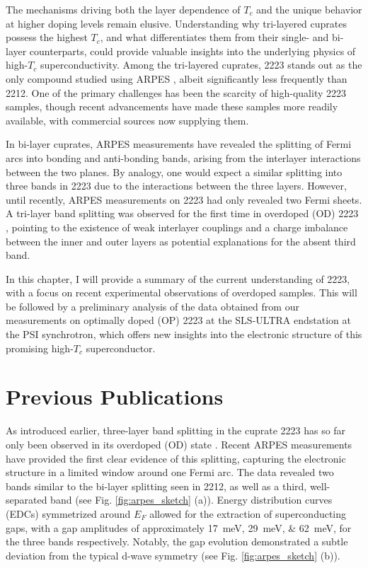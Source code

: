The mechanisms driving both the layer dependence of $T_c$ and the unique behavior at higher doping levels remain elusive.
Understanding why tri-layered cuprates possess the highest $T_c$, and what differentiates them from their single- and bi-layer counterparts, could provide valuable insights into the underlying physics of high-$T_c$ superconductivity.
Among the tri-layered cuprates, 2223 stands out as the only compound studied using ARPES \cite{feng_electronic_2002,muller_fermi_2002,sato_low_2002,matsui_bcs-like_2003,ideta_angle-resolved_2010, ideta_enhanced_2010, ideta_energy_2012,kunisada_observation_2017,ideta_hybridization_2021,luo_electronic_2023}, albeit significantly less frequently than 2212.
One of the primary challenges has been the scarcity of high-quality 2223 samples, though recent advancements have made these samples more readily available, with commercial sources now supplying them.

In bi-layer cuprates, ARPES measurements have revealed the splitting of Fermi arcs into bonding and anti-bonding bands, arising from the interlayer interactions between the two  planes.
By analogy, one would expect a similar splitting into three bands in 2223 due to the interactions between the three  layers.
However, until recently, ARPES measurements on 2223 had only revealed two Fermi sheets.
A tri-layer band splitting was observed for the first time in overdoped (OD) 2223 \cite{luo_electronic_2023}, pointing to the existence of weak interlayer couplings and a charge imbalance between the inner and outer  layers as potential explanations for the absent third band.

In this chapter, I will provide a summary of the current understanding of 2223, with a focus on recent experimental observations of overdoped samples.
This will be followed by a preliminary analysis of the data obtained from our measurements on optimally doped (OP) 2223 at the SLS-ULTRA endstation at the PSI synchrotron, which offers new insights into the electronic structure of this promising high-$T_c$ superconductor.

\section{Previous Publications}

As introduced earlier, three-layer band splitting in the cuprate 2223 has so far only been observed in its overdoped (OD) state \cite{luo_electronic_2023}.
Recent ARPES measurements have provided the first clear evidence of this splitting, capturing the electronic structure in a limited window around one Fermi arc.
The data revealed two bands similar to the bi-layer splitting seen in 2212, as well as a third, well-separated band (see Fig. \ref{fig:arpes_sketch} (a)).
Energy distribution curves (EDCs) symmetrized around $E_F$ allowed for the extraction of superconducting gaps, with a gap amplitudes of approximately \qtylist{17;29;62}{\milli\electronvolt}, for the three bands respectively.
Notably, the gap evolution demonstrated a subtle deviation from the typical d-wave symmetry (see Fig. \ref{fig:arpes_sketch} (b)).

